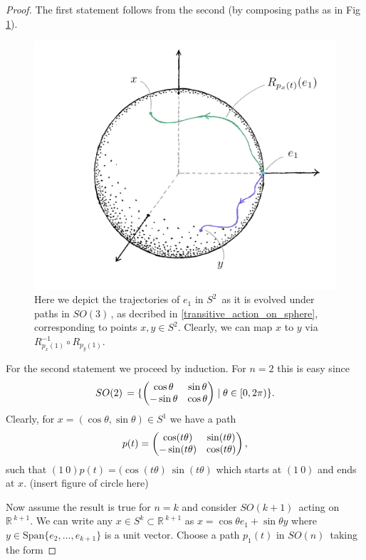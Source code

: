 \documentclass[12pt,a4paper]{article}
\newcommand{\rR}{\ensuremath{\mathbb{R}\,}}
\newcommand{\gsok}[1]{\ensuremath{SO(#1)\,}}
\newcommand{\sph}[1]{\ensuremath{S^{#1}}\,}
\begin{document}
\begin{proof}
The first statement follows from the second (by composing paths as in Fig \ref{compose_paths}).

\begin{figure}
\center
\includegraphics[scale=0.45]{figs/composing_paths/sphere_colour.png}
\caption{Here we depict the trajectories of $e_1$ in \sph{2} as it is evolved under paths in \gsok{3}, as decribed in \ref{transitive_action_on_sphere}, corresponding to points $x, y \in S^2$. Clearly, we can map $x$ to $y$ via $R_{p_x(1)}^{-1}\circ R_{p_y(1)}$.}
\label{compose_paths}
\end{figure}


For the second statement we proceed by induction. For $n = 2$ this is easy since
\[
\gsok{2} = \{\pmqty{\cos \theta & \sin \theta \\ -\sin \theta & \cos \theta}\mid \theta \in [0, 2\pi )\}.
\]
Clearly, for $x = (\cos\theta, \sin\theta) \in S^1$ we have a path
\[
p(t) = \pmqty{\cos (t\theta) & \sin (t\theta) \\ -\sin (t\theta) & \cos (t\theta)},
\]
such that $(1\ 0)p(t) = (\cos(t\theta)\ \sin(t\theta)$ which starts at $(1\ 0)$ and ends at $x$.
(insert figure of circle here)

Now assume the result is true for $n=k$ and consider \gsok{k+1} acting on $\rR^{k+1}$. We can write any $x \in S^k \subset \rR^{k+1}$ as $x = \cos\theta e_1 + \sin\theta y$ where $y \in \mbox{Span}\{e_2, \hdots, e_{k+1}\}$ is a unit vector. Choose a path $p_1(t)$ in \gsok{n} taking the form


\end{proof}
\end{document}
